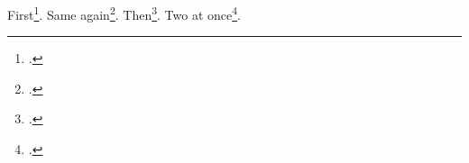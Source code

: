 \documentclass{article}
\begin{document}
First\footcite{knuth:ct:a}. Same again\footcite{knuth:ct:a}. Then\footcite{aksin}.
Two at once\footcites[see][p.~3]{baez/article}[and][p.~9]{baez/online}.
\printbibliography
\end{document}
